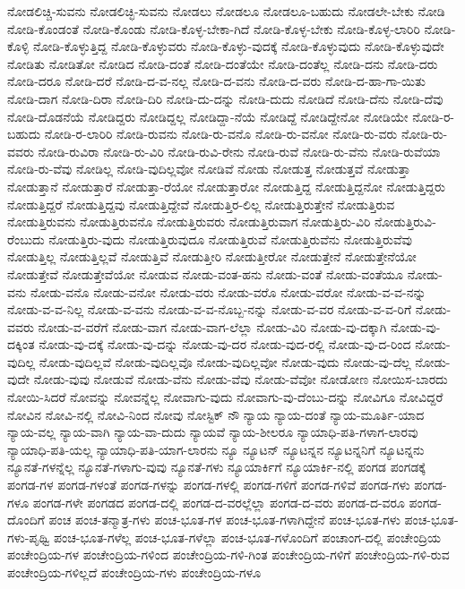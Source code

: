 {ನೋಡಲಿಚ್ಚಿ-ಸುವನು
ನೋಡಲಿಚ್ಛಿ-ಸುವನು
ನೋಡಲು
ನೋಡಲೂ
ನೋಡಲೂ-ಬಹುದು
ನೋಡಲೇ-ಬೇಕು
ನೋಡಿ
ನೋಡಿ-ಕೊಂಡಂತೆ
ನೋಡಿ-ಕೊಂಡು
ನೋಡಿ-ಕೊಳ್ಳ-ಬೇಕಾ-ಗಿದೆ
ನೋಡಿ-ಕೊಳ್ಳ-ಬೇಕು
ನೋಡಿ-ಕೊಳ್ಳ-ಲಾರಿರಿ
ನೋಡಿ-ಕೊಳ್ಳಿ
ನೋಡಿ-ಕೊಳ್ಳುತ್ತಿದ್ದ
ನೋಡಿ-ಕೊಳ್ಳುವರು
ನೋಡಿ-ಕೊಳ್ಳು-ವುದಕ್ಕೆ
ನೋಡಿ-ಕೊಳ್ಳುವುದು
ನೋಡಿ-ಕೊಳ್ಳುವುದೇ
ನೋಡಿತು
ನೋಡಿತೋ
ನೋಡಿದ
ನೋಡಿ-ದಂತೆ
ನೋಡಿ-ದಂತೆಯೇ
ನೋಡಿ-ದಂತೆಲ್ಲ
ನೋಡಿ-ದನು
ನೋಡಿ-ದರು
ನೋಡಿ-ದರೂ
ನೋಡಿ-ದರೆ
ನೋಡಿ-ದ-ವ-ನಲ್ಲ
ನೋಡಿ-ದ-ವನು
ನೋಡಿ-ದ-ವರು
ನೋಡಿ-ದ-ಹಾ-ಗಾ-ಯಿತು
ನೋಡಿ-ದಾಗ
ನೋಡಿ-ದಿರಾ
ನೋಡಿ-ದಿರಿ
ನೋಡಿ-ದು-ದನ್ನು
ನೋಡಿ-ದುದು
ನೋಡಿದೆ
ನೋಡಿ-ದೆನು
ನೋಡಿ-ದೆವು
ನೋಡಿ-ದೊಡನೆಯೆ
ನೋಡಿದ್ದರು
ನೋಡಿದ್ದಲ್ಲ
ನೋಡಿದ್ದಾ-ನೆಯೆ
ನೋಡಿದ್ದೆ
ನೋಡಿದ್ದೇನೋ
ನೋಡಿಯೇ
ನೋಡಿ-ರ-ಬಹುದು
ನೋಡಿ-ರ-ಲಾರಿರಿ
ನೋಡಿ-ರುವನು
ನೋಡಿ-ರು-ವನೊ
ನೋಡಿ-ರು-ವನೋ
ನೋಡಿ-ರು-ವರು
ನೋಡಿ-ರು-ವವರು
ನೋಡಿ-ರುವಿರಾ
ನೋಡಿ-ರು-ವಿರಿ
ನೋಡಿ-ರುವಿ-ರೇನು
ನೋಡಿ-ರುವೆ
ನೋಡಿ-ರು-ವೆನು
ನೋಡಿ-ರುವೆಯಾ
ನೋಡಿ-ರು-ವೆವು
ನೋಡಿಲ್ಲ
ನೋಡಿ-ವುದಿಲ್ಲವೋ
ನೋಡಿವೆ
ನೋಡು
ನೋಡುತ್ತ
ನೋಡುತ್ತವೆ
ನೋಡುತ್ತಾ
ನೋಡುತ್ತಾನೆ
ನೋಡುತ್ತಾರೆ
ನೋಡುತ್ತಾ-ರೆಯೋ
ನೋಡುತ್ತಾರೋ
ನೋಡುತ್ತಿದ್ದ
ನೋಡುತ್ತಿದ್ದನೋ
ನೋಡುತ್ತಿದ್ದರು
ನೋಡುತ್ತಿದ್ದರೆ
ನೋಡುತ್ತಿದ್ದವು
ನೋಡುತ್ತಿದ್ದೇವೆ
ನೋಡುತ್ತಿರ-ಲಿಲ್ಲ
ನೋಡುತ್ತಿರುತ್ತೇನೆ
ನೋಡುತ್ತಿರುವ
ನೋಡುತ್ತಿರುವನು
ನೋಡುತ್ತಿರುವನೊ
ನೋಡುತ್ತಿರುವರು
ನೋಡುತ್ತಿರುವಾಗ
ನೋಡುತ್ತಿರು-ವಿರಿ
ನೋಡುತ್ತಿರುವಿ-ರೆಂಬುದು
ನೋಡುತ್ತಿರು-ವುದು
ನೋಡುತ್ತಿರುವುದೂ
ನೋಡುತ್ತಿರುವೆ
ನೋಡುತ್ತಿರುವೆನು
ನೋಡುತ್ತಿರುವೆವು
ನೋಡುತ್ತಿಲ್ಲ
ನೋಡುತ್ತಿಲ್ಲವೆ
ನೋಡುತ್ತಿವೆ
ನೋಡುತ್ತೀರಿ
ನೋಡುತ್ತೀರೋ
ನೋಡುತ್ತೇನೆ
ನೋಡುತ್ತೇನೆಯೋ
ನೋಡುತ್ತೇವೆ
ನೋಡುತ್ತೇವೆಯೋ
ನೋಡುವ
ನೋಡು-ವಂತ-ಹನು
ನೋಡು-ವಂತೆ
ನೋಡು-ವಂತೆಯೂ
ನೋಡು-ವನು
ನೋಡು-ವನೊ
ನೋಡು-ವನೋ
ನೋಡು-ವರು
ನೋಡು-ವರೊ
ನೋಡು-ವರೋ
ನೋಡು-ವ-ವ-ನನ್ನು
ನೋಡು-ವ-ವ-ನಿಲ್ಲ
ನೋಡು-ವ-ವನು
ನೋಡು-ವ-ವ-ನೊಬ್ಬ-ನನ್ನು
ನೋಡು-ವ-ವರ
ನೋಡು-ವ-ವ-ರಿಗೆ
ನೋಡು-ವವರು
ನೋಡು-ವ-ವರೆಗೆ
ನೋಡು-ವಾಗ
ನೋಡು-ವಾಗ-ಲೆಲ್ಲಾ
ನೋಡು-ವಿರಿ
ನೋಡು-ವು-ದಕ್ಕಾಗಿ
ನೋಡು-ವು-ದಕ್ಕಿಂತ
ನೋಡು-ವು-ದಕ್ಕೆ
ನೋಡು-ವು-ದನ್ನು
ನೋಡು-ವು-ದರ
ನೋಡು-ವುದ-ರಲ್ಲಿ
ನೋಡು-ವು-ದ-ರಿಂದ
ನೋಡು-ವುದಿಲ್ಲ
ನೋಡು-ವುದಿಲ್ಲವೆ
ನೋಡು-ವುದಿಲ್ಲವೊ
ನೋಡು-ವುದಿಲ್ಲವೋ
ನೋಡು-ವುದು
ನೋಡು-ವು-ದೆಲ್ಲ
ನೋಡು-ವುದೇ
ನೋಡು-ವುವು
ನೋಡುವೆ
ನೋಡು-ವೆನು
ನೋಡು-ವೆವು
ನೋಡು-ವೆವೋ
ನೋಡೋಣ
ನೋಯಿಸ-ಬಾರದು
ನೋಯಿ-ಸಿದರೆ
ನೋವನ್ನು
ನೋವನ್ನೆಲ್ಲ
ನೋವಾಗು-ವುದು
ನೋವಾಗು-ವು-ದೆಂಬು-ದನ್ನು
ನೋವಿಗೂ
ನೋವಿದ್ದರೆ
ನೋವಿನ
ನೋವಿ-ನಲ್ಲಿ
ನೋವಿ-ನಿಂದ
ನೋವು
ನೋಸ್ಟಿಕ್
ನೌ
ನ್ಯಾಯ
ನ್ಯಾಯ-ದಂತೆ
ನ್ಯಾಯ-ಮೂರ್ತಿ-ಯಾದ
ನ್ಯಾಯ-ವಲ್ಲ
ನ್ಯಾಯ-ವಾಗಿ
ನ್ಯಾಯ-ವಾ-ದುದು
ನ್ಯಾಯವೆ
ನ್ಯಾಯ-ಶೀಲರೂ
ನ್ಯಾಯಾಧಿ-ಪತಿ-ಗಳಾಗ-ಲಾರವು
ನ್ಯಾಯಾಧಿ-ಪತಿ-ಯಲ್ಲ
ನ್ಯಾಯಾಧಿ-ಪತಿ-ಯಾಗ-ಲಾರನು
ನ್ಯೂ
ನ್ಯೂಟನ್
ನ್ಯೂಟನ್ನನ
ನ್ಯೂಟನ್ನನಿಗೆ
ನ್ಯೂಟನ್ನನು
ನ್ಯೂನತೆ-ಗಳನ್ನೆಲ್ಲ
ನ್ಯೂನತೆ-ಗಳಾಗು-ವುವು
ನ್ಯೂನತೆ-ಗಳು
ನ್ಯೂಯಾರ್ಕಿಗೆ
ನ್ಯೂಯಾರ್ಕಿ-ನಲ್ಲಿ
ಪಂಗಡ
ಪಂಗಡಕ್ಕೆ
ಪಂಗಡ-ಗಳ
ಪಂಗಡ-ಗಳಂತೆ
ಪಂಗಡ-ಗಳನ್ನು
ಪಂಗಡ-ಗಳಲ್ಲಿ
ಪಂಗಡ-ಗಳಿಗೆ
ಪಂಗಡ-ಗಳಿವೆ
ಪಂಗಡ-ಗಳು
ಪಂಗಡ-ಗಳೂ
ಪಂಗಡ-ಗಳೇ
ಪಂಗಡದ
ಪಂಗಡ-ದಲ್ಲಿ
ಪಂಗಡ-ದ-ವರಲ್ಲೆಲ್ಲಾ
ಪಂಗಡ-ದ-ವರು
ಪಂಗಡ-ದ-ವರೂ
ಪಂಗಡ-ದೊಂದಿಗೆ
ಪಂಚ
ಪಂಚ-ತನ್ಮಾತ್ರ-ಗಳು
ಪಂಚ-ಭೂತ-ಗಳ
ಪಂಚ-ಭೂತ-ಗಳಾಗಿದ್ದೇನೆ
ಪಂಚ-ಭೂತ-ಗಳು
ಪಂಚ-ಭೂತ-ಗಳು-ಪೃಥ್ವಿ
ಪಂಚ-ಭೂತ-ಗಳೆಲ್ಲ
ಪಂಚ-ಭೂತ-ಗಳೆಲ್ಲಾ
ಪಂಚ-ಭೂತ-ಗಳೊಂದಿಗೆ
ಪಂಚಾಂಗ-ದಲ್ಲಿ
ಪಂಚೇಂದ್ರಿಯ
ಪಂಚೇಂದ್ರಿಯ-ಗಳ
ಪಂಚೇಂದ್ರಿಯ-ಗಳಿಂದ
ಪಂಚೇಂದ್ರಿಯ-ಗಳಿ-ಗಿಂತ
ಪಂಚೇಂದ್ರಿಯ-ಗಳಿಗೆ
ಪಂಚೇಂದ್ರಿಯ-ಗಳಿ-ರುವ
ಪಂಚೇಂದ್ರಿಯ-ಗಳಿಲ್ಲದೆ
ಪಂಚೇಂದ್ರಿಯ-ಗಳು
ಪಂಚೇಂದ್ರಿಯ-ಗಳೂ
}
